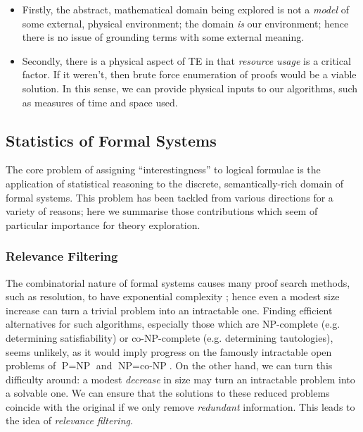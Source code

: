 \begin{itemize}

  \item Firstly, the abstract, mathematical domain being explored is not a \emph{model} of some external, physical environment; the domain \emph{is} our environment; hence there is no issue of grounding terms with some external meaning.

  \item Secondly, there is a physical aspect of TE in that \emph{resource usage} is a critical factor. If it weren't, then brute force enumeration of proofs would be a viable solution. In this sense, we can provide physical inputs to our algorithms, such as measures of time and space used.

\end{itemize}

\iffalse

\subsubsection{Universal Drives}

PhysRevLett.110.168702.pdf
Omohundro? Too physical.
\emph{Universal drives} are those

\fi

\subsection{Statistics of Formal Systems}

The core problem of assigning ``interestingness'' to logical formulae is the application of statistical reasoning to the discrete, semantically-rich domain of formal systems. This problem has been tackled from various directions for a variety of reasons; here we summarise those contributions which seem of particular importance for theory exploration.

\subsubsection{Relevance Filtering}
\label{relevance}

\citep{kuhlwein2012overview}

The combinatorial nature of formal systems causes many proof search methods, such as resolution, to have exponential complexity \citep{haken1985intractability}; hence even a modest size increase can turn a trivial problem into an intractable one. Finding efficient alternatives for such algorithms, especially those which are NP-complete (e.g. determining satisfiability) or co-NP-complete (e.g. determining tautologies), seems unlikely, as it would imply progress on the famously intractable open problems of $\text{P} = \text{NP}$ and $\text{NP} = \text{co-NP}$. On the other hand, we can turn this difficulty around: a modest \emph{decrease} in size may turn an intractable problem into a solvable one. We can ensure that the solutions to these reduced problems coincide with the original if we only remove \emph{redundant} information. This leads to the idea of \emph{relevance filtering}.

